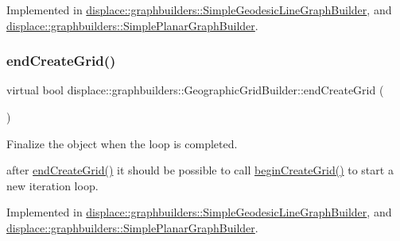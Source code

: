 Implemented in \mbox{\hyperlink{classdisplace_1_1graphbuilders_1_1_simple_geodesic_line_graph_builder_a87d7dbaefebb501f491fc4bb2afeb8eb}{displace\+::graphbuilders\+::\+Simple\+Geodesic\+Line\+Graph\+Builder}}, and \mbox{\hyperlink{classdisplace_1_1graphbuilders_1_1_simple_planar_graph_builder_acc34e4093c7e96d705b7269bebf20233}{displace\+::graphbuilders\+::\+Simple\+Planar\+Graph\+Builder}}.

\mbox{\label{classdisplace_1_1graphbuilders_1_1_geographic_grid_builder_ac5f018a1c87a2e1274ff620ee7b374a6}} 
\subsubsection{\texorpdfstring{endCreateGrid()}{endCreateGrid()}}
{\footnotesize\ttfamily virtual bool displace\+::graphbuilders\+::\+Geographic\+Grid\+Builder\+::end\+Create\+Grid (\begin{DoxyParamCaption}{ }\end{DoxyParamCaption})\hspace{0.3cm}{\ttfamily [pure virtual]}}



Finalize the object when the loop is completed. 

after \mbox{\hyperlink{classdisplace_1_1graphbuilders_1_1_geographic_grid_builder_ac5f018a1c87a2e1274ff620ee7b374a6}{end\+Create\+Grid()}} it should be possible to call \mbox{\hyperlink{classdisplace_1_1graphbuilders_1_1_geographic_grid_builder_ac929320efe7bd7c38064250651263999}{begin\+Create\+Grid()}} to start a new iteration loop. 

Implemented in \mbox{\hyperlink{classdisplace_1_1graphbuilders_1_1_simple_geodesic_line_graph_builder_a61e96188c1a6eb7366bc252e9a5f7d53}{displace\+::graphbuilders\+::\+Simple\+Geodesic\+Line\+Graph\+Builder}}, and \mbox{\hyperlink{classdisplace_1_1graphbuilders_1_1_simple_planar_graph_builder_a829ff92a1bd9dba3170a49ed42b193cc}{displace\+::graphbuilders\+::\+Simple\+Planar\+Graph\+Builder}}.

\mbox{\label{classdisplace_1_1graphbuilders_1_1_geographic_grid_builder_a4b896b8f9e562644829df273302674b0}} 
